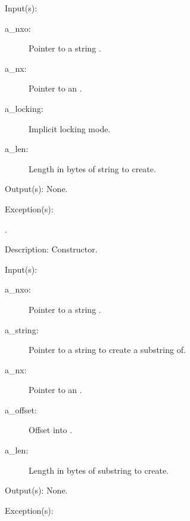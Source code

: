 \begin{capi}
\label{nxo_string_new}
	\begin{capilist}
	\item[Input(s): ]
		\begin{description}\item[]
		\item[a\_nxo: ]
			Pointer to a string .
		\item[a\_nx: ]
			Pointer to an .
		\item[a\_locking: ]
			Implicit locking mode.
		\item[a\_len: ]
			Length in bytes of string to create.
		\end{description}
	\item[Output(s): ] None.
	\item[Exception(s): ]
		\begin{description}\item[]
		\item[.]
		\end{description}
	\item[Description: ]
		Constructor.
	\end{capilist}
\label{nxo_string_substring_new}
	\begin{capilist}
	\item[Input(s): ]
		\begin{description}\item[]
		\item[a\_nxo: ]
			Pointer to a string \classname{nxo}.
		\item[a\_string: ]
			Pointer to a string  to create a
			substring of.
		\item[a\_nx: ]
			Pointer to an \classname{nx}.
		\item[a\_offset: ]
			Offset into \cvar{a\_string}.
		\item[a\_len: ]
			Length in bytes of substring to create.
		\end{description}
	\item[Output(s): ] None.
	\item[Exception(s): ]

\end{capilist}
\end{capi}
